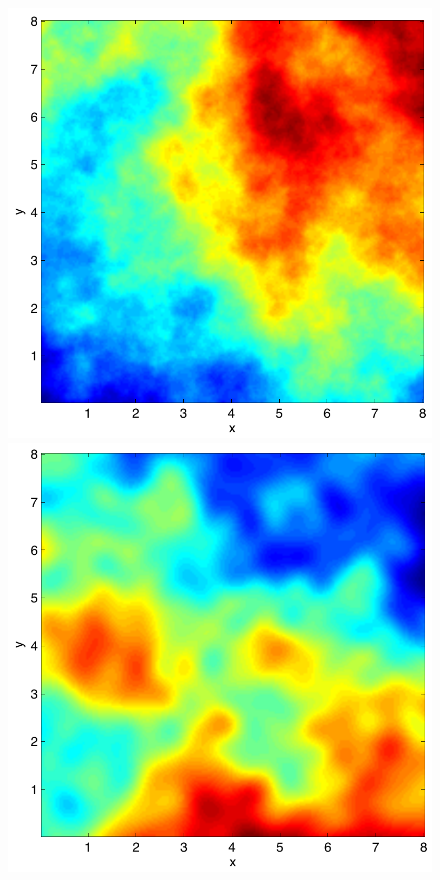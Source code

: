 \documentclass[pdf]{note}
\begin{document}
\begin{figure}[htbp]
    \centerline{
      \includegraphics[scale=.4]{plots/total_phase}
      \includegraphics[scale=.4]{plots/LO_phase}
}
\end{figure}
\end{document}
